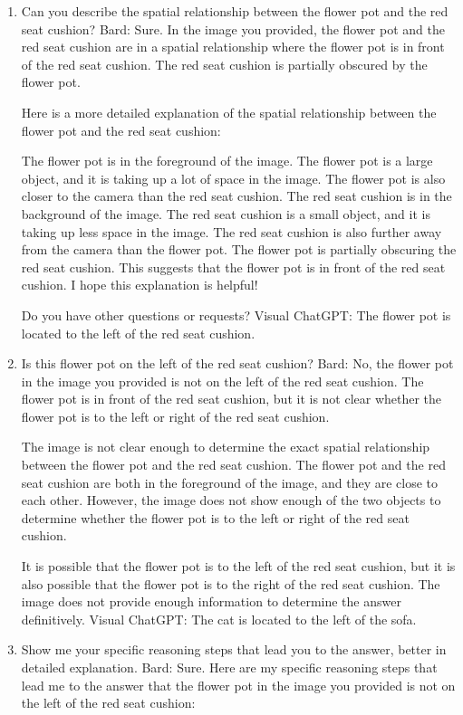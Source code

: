 \begin{enumerate}
    \item Can you describe the spatial relationship between the flower pot and the red seat cushion?
    \subitem Bard: 
    Sure. In the image you provided, the flower pot and the red seat cushion are in a spatial relationship where the flower pot is in front of the red seat cushion. The red seat cushion is partially obscured by the flower pot.
    
    Here is a more detailed explanation of the spatial relationship between the flower pot and the red seat cushion:
    
    The flower pot is in the foreground of the image. The flower pot is a large object, and it is taking up a lot of space in the image. The flower pot is also closer to the camera than the red seat cushion.
    The red seat cushion is in the background of the image. The red seat cushion is a small object, and it is taking up less space in the image. The red seat cushion is also further away from the camera than the flower pot.
    The flower pot is partially obscuring the red seat cushion. This suggests that the flower pot is in front of the red seat cushion.
    I hope this explanation is helpful!
    
    Do you have other questions or requests?
    \subitem Visual ChatGPT: The flower pot is located to the left of the red seat cushion.
    \item Is this flower pot on the left of the red seat cushion?
    \subitem Bard: 
    No, the flower pot in the image you provided is not on the left of the red seat cushion. The flower pot is in front of the red seat cushion, but it is not clear whether the flower pot is to the left or right of the red seat cushion.
    
    The image is not clear enough to determine the exact spatial relationship between the flower pot and the red seat cushion. The flower pot and the red seat cushion are both in the foreground of the image, and they are close to each other. However, the image does not show enough of the two objects to determine whether the flower pot is to the left or right of the red seat cushion.
    
    It is possible that the flower pot is to the left of the red seat cushion, but it is also possible that the flower pot is to the right of the red seat cushion. The image does not provide enough information to determine the answer definitively.
    \subitem Visual ChatGPT: The cat is located to the left of the sofa.
    \item Show me your specific reasoning steps that lead you to the answer, better in detailed explanation.
    \subitem Bard: Sure. Here are my specific reasoning steps that lead me to the answer that the flower pot in the image you provided is not on the left of the red seat cushion:


\end{enumerate}
